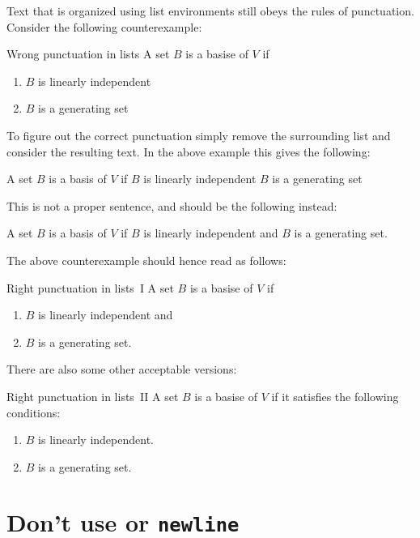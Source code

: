 Text that is organized using list environments still obeys the rules of punctuation.
Consider the following counterexample:
\begin{showlatex}{Wrong punctuation in lists}
  A set $B$ is a basise of $V$ if
  \begin{enumerate}
    \item
      $B$ is linearly independent
    \item
      $B$ is a generating set
  \end{enumerate}
\end{showlatex}
To figure out the correct punctuation simply remove the surrounding list and consider the resulting text.
In the above example this gives the following:
\begin{center}
  A set $B$ is a basis of $V$ if $B$ is linearly independent $B$ is a generating set
\end{center}
This is not a proper sentence, and should be the following instead:
\begin{center}
  A set $B$ is a basis of $V$ if $B$ is linearly independent and $B$ is a generating set.
\end{center}
The above counterexample should hence read as follows:
\begin{showlatex}{Right punctuation in lists~I}
  A set $B$ is a basise of $V$ if
  \begin{enumerate}
    \item
      $B$ is linearly independent and
    \item
      $B$ is a generating set.
  \end{enumerate}
\end{showlatex}
There are also some other acceptable versions:
\begin{showlatex}{Right punctuation in lists~II}
  A set $B$ is a basise of $V$ if it satisfies the following conditions:
  \begin{enumerate}
    \item
      $B$ is linearly independent.
    \item
      $B$ is a generating set.
  \end{enumerate}
\end{showlatex}





\section{Don’t use \texttt{\tbs\tbs} or \texttt{{\tbs}newline}}

